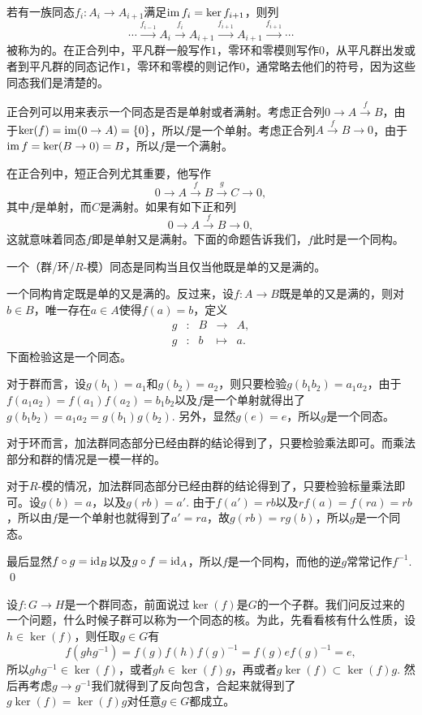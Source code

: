\para 若有一族同态$f_i:A_i\to A_{i+1}$满足$\operatorname{im} f_i=\ker f_{i+1}$，则列
\[
	\cdots \xrightarrow{f_{i-1}}A_i \xrightarrow{f_i} A_{i+1} \xrightarrow{f_{i+1}} A_{i+1}\xrightarrow{f_{i+1}}\cdots
\]
被称为的。在正合列中，平凡群一般写作$1$，零环和零模则写作$0$，从平凡群出发或者到平凡群的同态记作$1$，零环和零模的则记作$0$，通常略去他们的符号，因为这些同态我们是清楚的。

正合列可以用来表示一个同态是否是单射或者满射。考虑正合列$0\to A\xrightarrow{f} B$，由于$\ker(f)=\operatorname{im}(0\to A)=\{0\}$，所以$f$是一个单射。考虑正合列$A\xrightarrow{f} B\to 0$，由于$\operatorname{im} f=\ker(B\to 0)=B$，所以$f$是一个满射。

在正合列中，短正合列尤其重要，他写作
\[
	0\to A \xrightarrow{f} B \xrightarrow{g} C\to 0,
\]
其中$f$是单射，而$C$是满射。如果有如下正和列
\[
	0\to A \xrightarrow{f} B \to 0,
\]
这就意味着同态$f$即是单射又是满射。下面的命题告诉我们，$f$此时是一个同构。

\pro 一个（群/环/$R$-模）同态是同构当且仅当他既是单的又是满的。

\proof 一个同构肯定既是单的又是满的。反过来，设$f: A\to B$既是单的又是满的，则对$b\in B$，唯一存在$a\in A$使得$f(a)=b$，定义
\[
	\begin{array}{ccccc}
		g &:&B &\to& A,\\
		g &:&b &\mapsto& a.
	\end{array}
\]
下面检验这是一个同态。

对于群而言，设$g(b_1)=a_1$和$g(b_2)=a_2$，则只要检验$g(b_1b_2)=a_1a_2$，由于$f(a_1a_2)=f(a_1)f(a_2)=b_1b_2$以及$f$是一个单射就得出了$g(b_1b_2)=a_1a_2=g(b_1)g(b_2)$. 另外，显然$g(e)=e$，所以$g$是一个同态。

对于环而言，加法群同态部分已经由群的结论得到了，只要检验乘法即可。而乘法部分和群的情况是一模一样的。

对于$R$-模的情况，加法群同态部分已经由群的结论得到了，只要检验标量乘法即可。设$g(b)=a$，以及$g(rb)=a'$. 由于$f(a')=rb$以及$rf(a)=f(ra)=rb$，所以由$f$是一个单射也就得到了$a'=ra$，故$g(rb)=rg(b)$，所以$g$是一个同态。

最后显然$f\circ g =\operatorname{id}_B$以及$g\circ f=\operatorname{id}_A$，所以$f$是一个同构，而他的逆$g$常常记作$f^{-1}$.
\qed

\para 设$f:G\to H$是一个群同态，前面说过$\ker(f)$是$G$的一个子群。我们问反过来的一个问题，什么时候子群可以称为一个同态的核。为此，先看看核有什么性质，设$h\in \ker(f)$，则任取$g\in G$有
\[
	f\left(ghg^{-1}\right)=f(g)f(h)f(g)^{-1}=f(g)ef(g)^{-1}=e,
\]
所以$ghg^{-1}\in \ker(f)$，或者$gh \in \ker(f)g$，再或者$g\ker(f)\subset \ker(f)g$. 然后再考虑$g\to g^{-1}$我们就得到了反向包含，合起来就得到了$g\ker(f)=\ker(f)g$对任意$g\in G$都成立。

